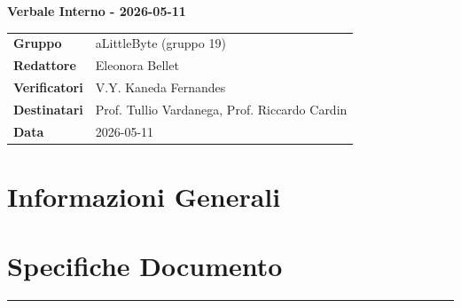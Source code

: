 \documentclass[a4paper,12pt]{article}
\begin{document}
\thispagestyle{firstpage}

\vspace*{0.5cm}

\begin{center}
    {\LARGE \textbf{Verbale Interno - 2026-05-11}}
\end{center}

\vspace{1.5cm}

\begin{center}
    \renewcommand{\arraystretch}{1.3}
    \begin{tcolorbox}[
        width=0.92\textwidth,
        colback=gray!6,
        colframe=gray!45,
        boxrule=0.5pt,
        arc=2mm,
        boxsep=0pt,
        left=8pt, right=8pt, top=8pt, bottom=8pt
    ]
        \begin{tabularx}{\linewidth}{>{\bfseries}p{3.5cm} X}
            Gruppo      & aLittleByte (gruppo 19) \\
            Redattore   & Eleonora Bellet \\
            Verificatori & V.Y. Kaneda Fernandes\\
            Destinatari & Prof. Tullio Vardanega, Prof. Riccardo Cardin \\
            Data        & 2026-05-11\\
        \end{tabularx}
    \end{tcolorbox}
\end{center}

\newpage

\tableofcontents
\newpage
\section{Informazioni Generali}
\section*{Specifiche Documento}
\hrule
\vspace{1cm}
\end{document}
